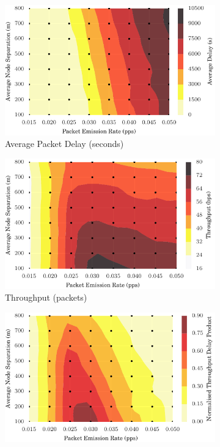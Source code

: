 \documentclass[runningheads,a4paper]{llncs}
\begin{document}
\begin{figure}
\begin{subfigure}{.5\textwidth}
  \centering
  \includegraphics[width=.8\linewidth]{img/delay_2d_static.pdf}
  \caption{Average Packet Delay (seconds)}
  \label{fig:2d_delay}
\end{subfigure}%
\begin{subfigure}{.5\textwidth}
  \centering
  \includegraphics[width=.8\linewidth]{img/throughput_2d_static.pdf}
  \caption{Throughput (packets)}
  \label{fig:2d_throughput}
\end{subfigure}
\begin{subfigure}{.5\textwidth}
\centering
  \includegraphics[width=.8\linewidth]{img/2d_normed_product_static.pdf}

\end{subfigure}
\end{figure}
\end{document}
